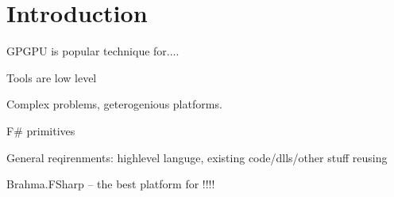 \section{Introduction}

GPGPU is popular technique for....

Tools are low level

Complex problems, geterogenious platforms.

F\# primitives

General reqirenments: highlevel languge, existing code/dlls/other stuff reusing

Brahma.FSharp -- the best platform for !!!!